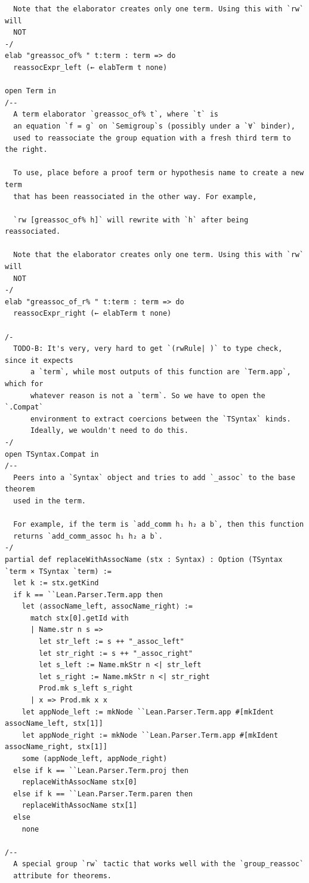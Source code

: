 \documentclass[10pt,a4paper]{article}
\begin{document}
\begin{Verbatim}
  Note that the elaborator creates only one term. Using this with `rw` will
  NOT
-/
elab "greassoc_of% " t:term : term => do
  reassocExpr_left (← elabTerm t none)

open Term in
/--
  A term elaborator `greassoc_of% t`, where `t` is
  an equation `f = g` on `Semigroup`s (possibly under a `∀` binder),
  used to reassociate the group equation with a fresh third term to the right.

  To use, place before a proof term or hypothesis name to create a new term
  that has been reassociated in the other way. For example,

  `rw [greassoc_of% h]` will rewrite with `h` after being reassociated.

  Note that the elaborator creates only one term. Using this with `rw` will
  NOT
-/
elab "greassoc_of_r% " t:term : term => do
  reassocExpr_right (← elabTerm t none)

/-
  TODO-B: It's very, very hard to get `(rwRule| )` to type check, since it expects
      a `term`, while most outputs of this function are `Term.app`, which for
      whatever reason is not a `term`. So we have to open the `.Compat`
      environment to extract coercions between the `TSyntax` kinds.
      Ideally, we wouldn't need to do this.
-/
open TSyntax.Compat in
/--
  Peers into a `Syntax` object and tries to add `_assoc` to the base theorem
  used in the term.

  For example, if the term is `add_comm h₁ h₂ a b`, then this function
  returns `add_comm_assoc h₁ h₂ a b`.
-/
partial def replaceWithAssocName (stx : Syntax) : Option (TSyntax `term × TSyntax `term) :=
  let k := stx.getKind
  if k == ``Lean.Parser.Term.app then
    let ⟨assocName_left, assocName_right⟩ :=
      match stx[0].getId with
      | Name.str n s =>
        let str_left := s ++ "_assoc_left"
        let str_right := s ++ "_assoc_right"
        let s_left := Name.mkStr n <| str_left
        let s_right := Name.mkStr n <| str_right
        Prod.mk s_left s_right
      | x => Prod.mk x x
    let appNode_left := mkNode ``Lean.Parser.Term.app #[mkIdent assocName_left, stx[1]]
    let appNode_right := mkNode ``Lean.Parser.Term.app #[mkIdent assocName_right, stx[1]]
    some (appNode_left, appNode_right)
  else if k == ``Lean.Parser.Term.proj then
    replaceWithAssocName stx[0]
  else if k == ``Lean.Parser.Term.paren then
    replaceWithAssocName stx[1]
  else
    none

/--
  A special group `rw` tactic that works well with the `group_reassoc`
  attribute for theorems.


\end{Verbatim}
\end{document}
